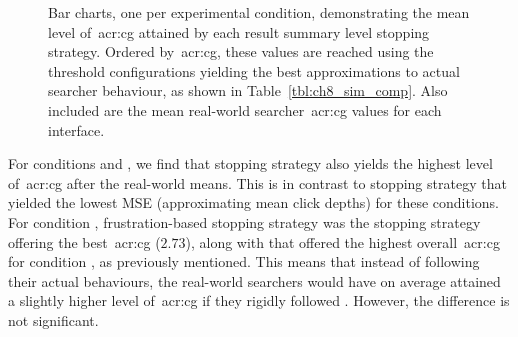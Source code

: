 \begin{figure}[p!]
    \centering
    \caption[Simulated and real-world~\gls{acr:cg} rankings]{Bar charts, one per experimental condition, demonstrating the mean level of~\gls{acr:cg} attained by each result summary level stopping strategy. Ordered by~\gls{acr:cg}, these values are reached using the threshold configurations yielding the best approximations to actual searcher behaviour, as shown in Table~\ref{tbl:ch8_sim_comp}. Also included are the mean real-world searcher~\gls{acr:cg} values for each interface.}
    \label{fig:ch8_sim_comparison_rankings}
\end{figure}

For conditions  and , we find that stopping strategy  also yields the highest level of~\gls{acr:cg} after the real-world means. This is in contrast to stopping strategy  that yielded the lowest MSE (approximating mean click depths) for these conditions. For condition , frustration-based stopping strategy  was the stopping strategy offering the best~\gls{acr:cg} ($2.73$), along with  that offered the highest overall~\gls{acr:cg} for condition , as previously mentioned. This means that instead of following their actual behaviours, the real-world searchers would have on average attained a slightly higher level of~\gls{acr:cg} if they rigidly followed . However, the difference is not significant.

